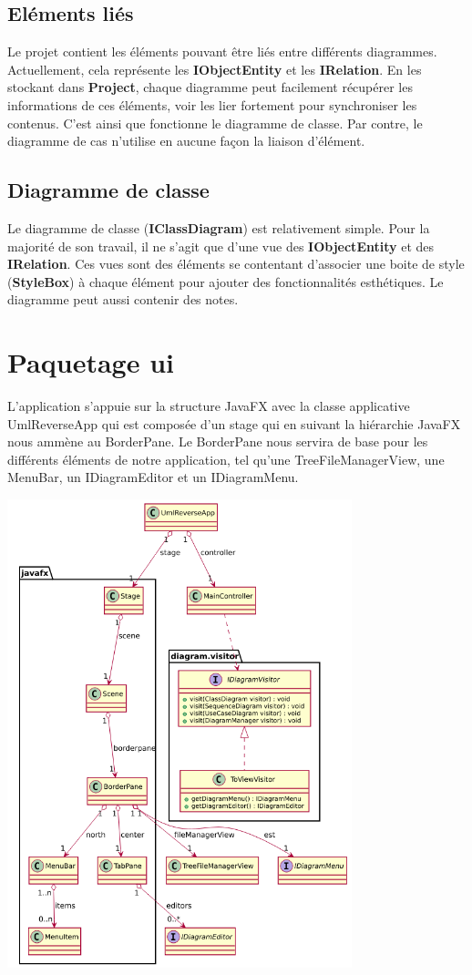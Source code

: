 \documentclass[a4paper,10pt]{article}
\begin{document}
    \subsection{Eléments liés}
    Le projet contient les éléments pouvant être liés entre différents diagrammes.
    Actuellement, cela représente les \textbf{IObjectEntity} et les \textbf{IRelation}.
    En les stockant dans \textbf{Project}, chaque diagramme peut facilement récupérer 
    les informations de ces éléments, voir les lier fortement pour synchroniser les contenus.
    C'est ainsi que fonctionne le diagramme de classe. Par contre, le diagramme de cas n'utilise 
    en aucune façon la liaison d'élément.
    
    \subsection{Diagramme de classe}
    Le diagramme de classe (\textbf{IClassDiagram}) est relativement simple. 
    Pour la majorité de son travail, il ne s'agit que d'une vue des \textbf{IObjectEntity} 
    et des \textbf{IRelation}.
    Ces vues sont des éléments se contentant d'associer une boite de style (\textbf{StyleBox}) 
    à chaque élément pour ajouter des fonctionnalités esthétiques.
    Le diagramme peut aussi contenir des notes.
    
   \newpage
  \section{Paquetage ui}
    L'application s'appuie sur la structure JavaFX avec la classe applicative UmlReverseApp qui est composée d'un stage qui en suivant
    la hiérarchie JavaFX nous ammène au BorderPane. Le BorderPane nous servira de base pour les différents éléments de notre application,
    tel qu'une TreeFileManagerView, une MenuBar, un IDiagramEditor et un IDiagramMenu.
    \begin{center}
	\includegraphics[width=10cm]{imgDAL/Vue.png}
    \end{center}
  
\end{document}
